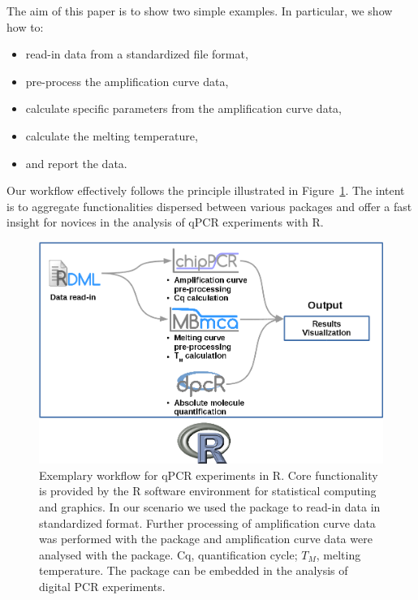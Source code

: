 The aim of this paper is to show two simple examples. In 
particular, we show how to:
\begin{itemize}
 \item read-in data from a standardized file format,
 \item pre-process the amplification curve data,
 \item calculate specific parameters from the amplification curve data,
 \item calculate the melting temperature,
 \item and report the data.
\end{itemize}

Our workflow effectively follows the principle illustrated in 
Figure~\ref{figure:workflow}. The intent is to aggregate functionalities 
dispersed between various packages and offer a fast insight for novices 
in the analysis of qPCR experiments with R.

\begin{figure}[htbp]
  \centering
  \includegraphics{figures/workflow.png}
  \caption{Exemplary workflow for qPCR experiments in R. Core functionality is 
provided by the R software environment for statistical computing and graphics. 
In our scenario we used the  package to read-in data in 
standardized format. Further processing of amplification curve data was 
performed with the  package and amplification curve data were 
analysed with the  package. Cq, quantification cycle; $T_{M}$, 
melting temperature. The  package can be embedded in the analysis 
of digital PCR experiments.
} \label{figure:workflow}
\end{figure}

